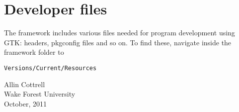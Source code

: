 \documentclass[11pt]{article}
\begin{document}
\section{Developer files}

The framework includes various files needed for program development
using GTK: headers, pkgconfig files and so on. To find these, navigate
inside the framework folder to 

\verb|Versions/Current/Resources|

\vspace{.2in}

\raggedright
Allin Cottrell \\
Wake Forest University \\
October, 2011
\end{document}
